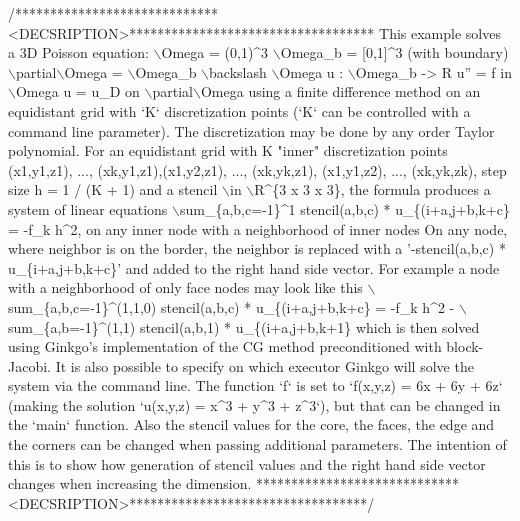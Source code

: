 \begin{DoxyCodeInclude}
\textcolor{comment}{/*****************************<DECSRIPTION>***********************************}
\textcolor{comment}{This example solves a 3D Poisson equation:}
\textcolor{comment}{}
\textcolor{comment}{    \(\backslash\)Omega = (0,1)^3}
\textcolor{comment}{    \(\backslash\)Omega\_b = [0,1]^3   (with boundary)}
\textcolor{comment}{    \(\backslash\)partial\(\backslash\)Omega = \(\backslash\)Omega\_b \(\backslash\)backslash \(\backslash\)Omega}
\textcolor{comment}{    u : \(\backslash\)Omega\_b -> R}
\textcolor{comment}{    u'' = f in \(\backslash\)Omega}
\textcolor{comment}{    u = u\_D on \(\backslash\)partial\(\backslash\)Omega}
\textcolor{comment}{}
\textcolor{comment}{using a finite difference method on an equidistant grid with `K` discretization}
\textcolor{comment}{points (`K` can be controlled with a command line parameter). The discretization}
\textcolor{comment}{may be done by any order Taylor polynomial.}
\textcolor{comment}{For an equidistant grid with K "inner" discretization points (x1,y1,z1), ...,}
\textcolor{comment}{(xk,y1,z1),(x1,y2,z1), ..., (xk,yk,z1), (x1,y1,z2), ..., (xk,yk,zk), step size h}
\textcolor{comment}{= 1 / (K + 1) and a stencil \(\backslash\)in \(\backslash\)R^\{3 x 3 x 3\}, the formula produces a system of}
\textcolor{comment}{linear equations}
\textcolor{comment}{}
\textcolor{comment}{\(\backslash\)sum\_\{a,b,c=-1\}^1 stencil(a,b,c) * u\_\{(i+a,j+b,k+c\} = -f\_k h^2,  on any inner}
\textcolor{comment}{node with a neighborhood of inner nodes}
\textcolor{comment}{}
\textcolor{comment}{On any node, where neighbor is on the border, the neighbor is replaced with a}
\textcolor{comment}{'-stencil(a,b,c) * u\_\{i+a,j+b,k+c\}' and added to the right hand side vector.}
\textcolor{comment}{For example a node with a neighborhood of only face nodes may look like this}
\textcolor{comment}{}
\textcolor{comment}{\(\backslash\)sum\_\{a,b,c=-1\}^(1,1,0) stencil(a,b,c) * u\_\{(i+a,j+b,k+c\} = -f\_k h^2 -}
\textcolor{comment}{\(\backslash\)sum\_\{a,b=-1\}^(1,1) stencil(a,b,1) * u\_\{(i+a,j+b,k+1\}}
\textcolor{comment}{}
\textcolor{comment}{which is then solved using Ginkgo's implementation of the CG method}
\textcolor{comment}{preconditioned with block-Jacobi. It is also possible to specify on which}
\textcolor{comment}{executor Ginkgo will solve the system via the command line.}
\textcolor{comment}{The function `f` is set to `f(x,y,z) = 6x + 6y + 6z` (making the solution}
\textcolor{comment}{`u(x,y,z) = x^3 + y^3 + z^3`), but that can be changed in the `main` function.}
\textcolor{comment}{Also the stencil values for the core, the faces, the edge and the corners can be}
\textcolor{comment}{changed when passing additional parameters.}
\textcolor{comment}{}
\textcolor{comment}{The intention of this is to show how generation of stencil values and the right}
\textcolor{comment}{hand side vector changes when increasing the dimension.}
\textcolor{comment}{*****************************<DECSRIPTION>**********************************/}


\end{DoxyCodeInclude}
